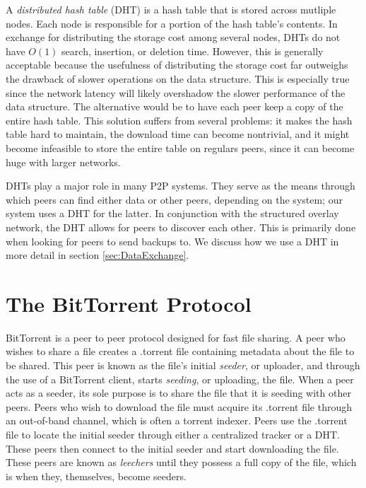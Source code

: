 \documentclass[12pt]{report}
\begin{document}
A \textit{distributed hash table} (DHT) is a hash table that is stored across mutliple nodes. Each node is responsible for a portion of the hash table's contents. In exchange for distributing the storage cost among several nodes, DHTs do not have $O(1)$ search, insertion, or deletion time. However, this is generally acceptable because the usefulness of distributing the storage cost far outweighs the drawback of slower operations on the data structure. This is especially true since the network latency will likely overshadow the slower performance of the data structure. The alternative would be to have each peer keep a copy of the entire hash table. This solution suffers from several problems: it makes the hash table hard to maintain, the download time can become nontrivial, and it might become infeasible to store the entire table on regulars peers, since it can become huge with larger networks.




DHTs play a major role in many P2P systems. They serve as the means through which peers can find either data or other peers, depending on the system; our system uses a DHT for the latter. In conjunction with the structured overlay network, the DHT allows for peers to discover each other. This is primarily done when looking for peers to send backups to. We discuss how we use a DHT in more detail in section \ref{sec:DataExchange}.

\section{The BitTorrent Protocol} \label{sec:TheBitTorrentProtocol}
BitTorrent is a peer to peer protocol designed for fast file sharing. A peer who wishes to share a file creates a .torrent file containing metadata about the file to be shared. This peer is known as the file's initial \textit{seeder}, or uploader, and through the use of a BitTorrent client, starts \textit{seeding}, or uploading, the file. When a peer acts as a seeder, its sole purpose is to share the file that it is seeding with other peers. Peers who wish to download the file must acquire its .torrent file through an out-of-band channel, which is often a torrent indexer. Peers use the .torrent file to locate the initial seeder through either a centralized tracker or a DHT. These peers then connect to the initial seeder and start downloading the file. These peers are known as \textit{leechers} until they possess a full copy of the file, which is when they, themselves, become seeders.
\end{document}
